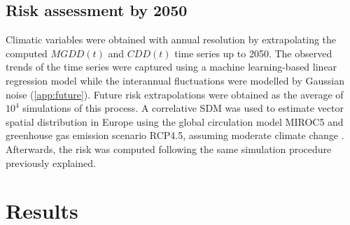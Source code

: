 \subsection{Risk assessment by 2050}

Climatic variables were obtained with annual resolution by extrapolating the
computed $MGDD(t)$ and $CDD(t)$ time series up to 2050. The observed trends of
the time series were captured using a machine learning-based linear regression
model while the interannual fluctuations were modelled by Gaussian noise
(\cref{app:future}). Future risk extrapolations were obtained as the average of
$10^4$ simulations of this process. A correlative SDM was used to estimate
vector spatial distribution in Europe using the global circulation model MIROC5
and greenhouse gas emission scenario RCP4.5, assuming moderate climate change
\cite{Godefroid2021}. Afterwards, the risk was computed following the same
simulation procedure previously explained.

\section{Results}

